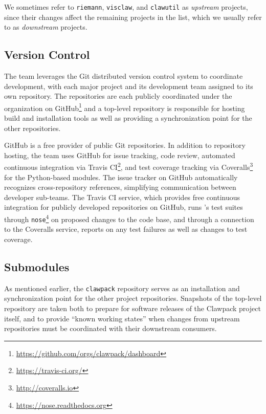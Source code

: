 We sometimes refer to \texttt{riemann}, \texttt{visclaw}, and
\texttt{clawutil} as
\textit{upstream} projects, since their changes affect the
remaining projects in the list, which we usually refer to as
\textit{downstream} projects.

\subsection{Version Control}

The \clawpack team leverages the Git distributed version control system
to coordinate development, with each major project and its development
team assigned to its own repository.  The repositories are each
publicly coordinated under the \clawpack organization on GitHub\footnote{\url{https://github.com/orgs/clawpack/dashboard}} and a
top-level \clawpack repository is responsible for hosting
build and installation tools as well as providing a synchronization
point for the other repositories.  

GitHub is a free provider of public Git repositories.  In addition to
repository hosting, the \clawpack team uses GitHub for issue tracking,
code review, automated continuous integration via Travis CI\footnote{\url{https://travis-ci.org/}},
and test coverage tracking via Coveralls\footnote{\url{http://coveralls.io}}
for the Python-based modules.  The issue tracker on
GitHub automatically recognizes cross-repository references,
simplifying communication between \clawpack developer sub-teams.  The
Travis CI service, which provides free continuous integration for
publicly developed repositories on GitHub, runs \clawpack's test
suites through \texttt{nose}\footnote{\url{https://nose.readthedocs.org}}
on proposed changes
to the code base, and through a connection to the Coveralls service,
reports on any test failures as well as changes to test coverage.

\subsection{Submodules}

As mentioned earlier, the \texttt{clawpack} repository serves as an
installation and synchronization point for the other project repositories.
Snapshots of the top-level repository are taken both to prepare for
software releases of the Clawpack project itself, and to provide
``known working states'' when changes from upstream repositories must
be coordinated with their downstream consumers.

